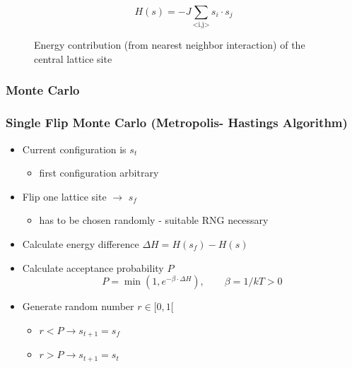 \documentclass{beamer}
\newcommand{\tikzfigC}[2]{\begin{figure}[h]\begin{center}\end{center}\caption{{#2}}\end{figure}}
\begin{document}
\begin{frame}
\begin{equation*}
H(s)= -J \sum_{\text{<i,j>}}s_i\cdot s_j
\end{equation*}\tikzfigC{Examples}{Energy contribution (from nearest neighbor interaction) of the central lattice site}
\end{frame}

\subsubsection{Monte Carlo}
\begin{frame}\frametitle{Single Flip Monte Carlo (Metropolis- Hastings Algorithm)}
\begin{itemize}
\item Current configuration is $s_t$
\begin{itemize}
\item first configuration arbitrary
\end{itemize}
\item Flip one lattice site $\rightarrow$ $s_f$
\begin{itemize}
\item  has to be chosen randomly - suitable RNG necessary
\end{itemize}
\item Calculate energy difference $\Delta H = H(s_f) - H(s)$
\item Calculate acceptance probability $P$
\begin{equation*}
P = \operatorname{min}\left(1,e^{-\beta\cdot \Delta H}\right),\qquad \beta = 1/kT > 0 
\end{equation*}
\item Generate random number $r \in [0,1[$
\begin{itemize}
\item $r<P \rightarrow s_{t+1} = s_f$ 
\item $r>P \rightarrow s_{t+1} = s_t$ 
\end{itemize}
\end{itemize}
\end{frame}
\end{document}
